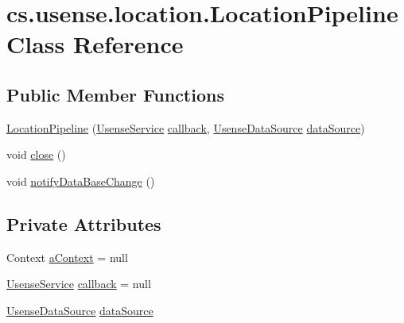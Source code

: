 \hypertarget{classcs_1_1usense_1_1location_1_1_location_pipeline}{}\section{cs.\+usense.\+location.\+Location\+Pipeline Class Reference}
\label{classcs_1_1usense_1_1location_1_1_location_pipeline}
\subsection*{Public Member Functions}
\begin{DoxyCompactItemize}
\item 
\hyperlink{classcs_1_1usense_1_1location_1_1_location_pipeline_a7e56683479efd00aad174c4a7f33e659}{Location\+Pipeline} (\hyperlink{classcs_1_1usense_1_1_usense_service}{Usense\+Service} \hyperlink{classcs_1_1usense_1_1location_1_1_location_pipeline_afecd4991b4fa95094242d329b3896b0e}{callback}, \hyperlink{classcs_1_1usense_1_1db_1_1_usense_data_source}{Usense\+Data\+Source} \hyperlink{classcs_1_1usense_1_1location_1_1_location_pipeline_ab13c3ed8bfbbd1f4af74d6cb884a9732}{data\+Source})
\item 
void \hyperlink{classcs_1_1usense_1_1location_1_1_location_pipeline_a774fa501fe4ae387af63d2d907a98d43}{close} ()
\item 
void \hyperlink{classcs_1_1usense_1_1location_1_1_location_pipeline_a2dc0b2f65fc9c6d15a037eb3528e8c14}{notify\+Data\+Base\+Change} ()
\end{DoxyCompactItemize}
\subsection*{Private Attributes}
\begin{DoxyCompactItemize}
\item 
Context \hyperlink{classcs_1_1usense_1_1location_1_1_location_pipeline_a4e289922c45b02bb43e38a20f4a3a9d9}{a\+Context} = null
\item 
\hyperlink{classcs_1_1usense_1_1_usense_service}{Usense\+Service} \hyperlink{classcs_1_1usense_1_1location_1_1_location_pipeline_afecd4991b4fa95094242d329b3896b0e}{callback} = null
\item 
\hyperlink{classcs_1_1usense_1_1db_1_1_usense_data_source}{Usense\+Data\+Source} \hyperlink{classcs_1_1usense_1_1location_1_1_location_pipeline_ab13c3ed8bfbbd1f4af74d6cb884a9732}{data\+Source}
\end{DoxyCompactItemize}
